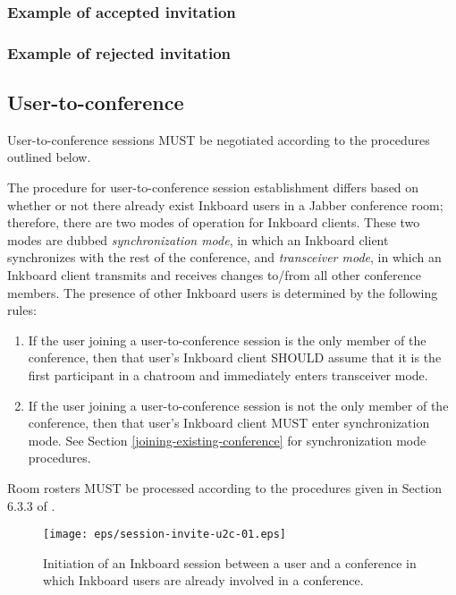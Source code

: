 \documentclass[11pt]{article}
\begin{document}
\subsubsection{Example of accepted invitation}

\subsubsection{Example of rejected invitation}

\subsection{User-to-conference}
User-to-conference sessions MUST be negotiated according to the procedures outlined below.

The procedure for user-to-conference session establishment differs based on whether or not there already exist Inkboard users in a Jabber conference room; therefore, there are two modes of operation for Inkboard clients.  These two modes are dubbed {\em synchronization mode}, in which an Inkboard client synchronizes with the rest of the conference, and {\em transceiver mode}, in which an Inkboard client transmits and receives changes to/from all other conference members.  The presence of other Inkboard users is determined by the following rules:

\begin{enumerate}
\item If the user joining a user-to-conference session is the only member of the conference, then that user's Inkboard client SHOULD assume that it is the first participant in a chatroom and immediately enters transceiver mode.
\item If the user joining a user-to-conference session is not the only member of the conference, then that user's Inkboard client MUST enter synchronization mode.  See Section \ref{joining-existing-conference} for synchronization mode procedures.
\end{enumerate}

Room rosters MUST be processed according to the procedures given in Section 6.3.3 of \cite{jep0045}.

\begin{figure}
\label{u2c-session-establishment-figure-accept}
\centering
\texttt{[image: eps/session-invite-u2c-01.eps]}
\caption{Initiation of an Inkboard session between a user and a conference in which Inkboard users are already involved in a conference.}
\end{figure}
\end{document}

